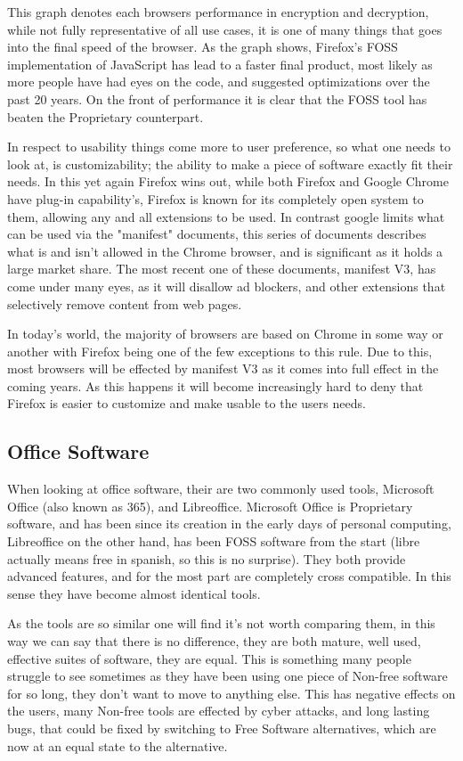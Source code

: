 \documentclass[a4paper,12pt]{article}
\begin{document}
{This graph denotes each browsers performance in encryption and decryption, while not fully representative of all use 
cases, it is one of many things that goes into the final speed of the browser. As the graph shows, Firefox's FOSS 
implementation of JavaScript has lead to a faster final product, most likely as more people have had eyes on the code, 
and suggested optimizations over the past 20 years. On the front of performance it is clear that the FOSS tool has beaten 
the Proprietary counterpart.

In respect to usability things come more to user preference, so what one needs to look at, is customizability; the ability 
to make a piece of software exactly fit their needs. In this yet again Firefox wins out, while both Firefox and Google Chrome 
have plug-in capability's, Firefox is known for its completely open system to them, allowing any and all extensions to be
used. In contrast google limits what can be used via the "manifest" documents, this series of documents describes what is
and isn't allowed in the Chrome browser, and is significant as it holds a large market share. The most recent one of these
documents, manifest V3\cite{MANIFESTv3}, has come under many eyes, as it will disallow ad blockers, and other extensions that selectively
remove content from web pages.

In today's world, the majority of browsers are based on Chrome in some way or another with Firefox being one of the few exceptions 
to this rule. Due to this, most browsers will be effected by manifest V3 as it comes into full effect in the coming years.
As this happens it will become increasingly hard to deny that Firefox is easier to customize and make usable to the users needs.

\subsection{Office Software}
When looking at office software, their are two commonly used tools, Microsoft Office (also known as 365), and Libreoffice.
Microsoft Office is Proprietary software, and has been since its creation in the early days of personal computing, Libreoffice 
on the other hand, has been FOSS software from the start (libre actually means free in spanish, so this is no surprise). 
They both provide advanced features, and for the most part are completely cross compatible. In this sense they have become
almost identical tools. 

As the tools are so similar one will find it's not worth comparing them, in this way we can say that there is no difference,
they are both mature, well used, effective suites of software, they are equal. This is something many people struggle to 
see sometimes as they have been using one piece of Non-free software for so long, they don't want to move to anything else.
This has negative effects on the users, many Non-free tools are effected by cyber attacks, and long lasting bugs, that could 
be fixed by switching to Free Software alternatives, which are now at an equal state to the alternative.

}
\end{document}
